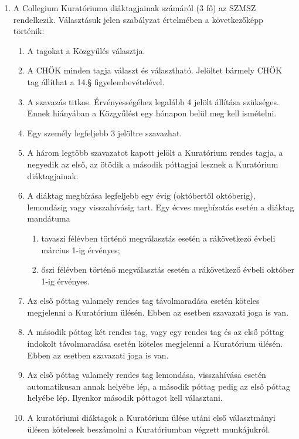 \documentclass{../styles/rulebook}
\begin{document}
\begin{enumerate}
	\item A Collegium Kuratóriuma diáktagjainak számáról (3 fő) az SZMSZ rendelkezik. Választásuk jelen szabályzat értelmében a következőképp történik: 
	\begin{enumerate}
		\item A tagokat a Közgyűlés választja.
		\item A CHÖK minden tagja választ és választható. Jelöltet bármely CHÖK tag állíthat a 14.§ figyelembevételével.
		\item A szavazás titkos. Érvényességéhez legalább 4 jelölt állítása szükséges. Ennek hiányában a Közgyűlést egy hónapon belül meg kell ismételni.
		\item Egy személy legfeljebb 3 jelöltre szavazhat.
		\item A három legtöbb szavazatot kapott jelölt a Kuratórium rendes tagja, a negyedik az első, az ötödik a második póttagjai lesznek a Kuratórium diáktagjainak.
		\item A diáktag megbízása legfeljebb egy évig (októbertől októberig), lemondásig vagy visszahívásig tart. Egy écves megbízatás esetén a diáktag mandátuma
		\begin{enumerate}
			\item tavaszi félévben történő megválasztás esetén a rákövetkező évbeli március 1-ig érvényes;
			\item őszi félévben történő megválasztás esetén a rákövetkező évbeli október 1-ig érvényes.
		\end{enumerate} 
		\item Az első póttag valamely rendes tag távolmaradása esetén köteles megjelenni a Kuratórium ülésén. Ebben az esetben szavazati joga is van.
		\item A második póttag két rendes tag, vagy egy rendes tag és az első póttag indokolt távolmaradása esetén köteles megjelenni a Kuratórium ülésén. Ebben az esetben szavazati joga is van.
		\item Az első póttag valamely rendes tag lemondása, visszahívása esetén automatikusan annak helyébe lép, a második póttag pedig az első póttag helyébe lép. Ilyenkor második póttagot kell választani.
		\item A kuratóriumi diáktagok a Kuratórium ülése utáni első választmányi ülésen kötelesek beszámolni a Kuratóriumban végzett munkájukról.
	\end{enumerate}
\end{enumerate}
\end{document}
